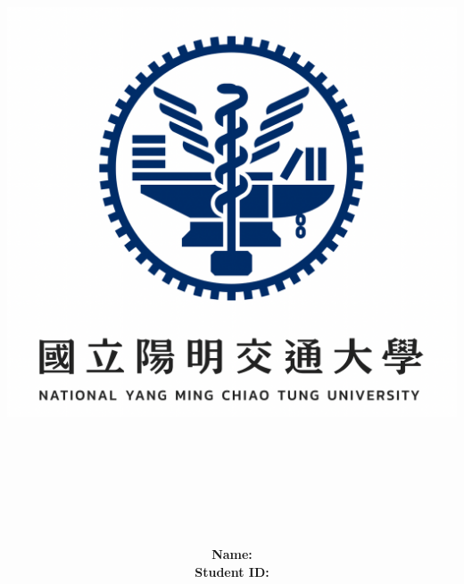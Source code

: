 \documentclass[12pt,a4paper]{report}
\title{
	\includegraphics[scale=0.5]{img/nycu_logo.png}\\
	~\\
	\LARGE\textbf{\reportSubtitle}\\
	\huge\textbf{\reportTitle}\\
}
\author{
	\begin{tabular}{rl}
		\textbf{Name: } & \authorName \\
		\textbf{Student ID: } & \authorStudentID  \\
	\end{tabular} \\~\\
	\authorDepartment
}
\begin{document}
	\maketitle
	\tableofcontents
	
	
	
	
	\begin{appendices}
		
	\end{appendices}
\end{document}
